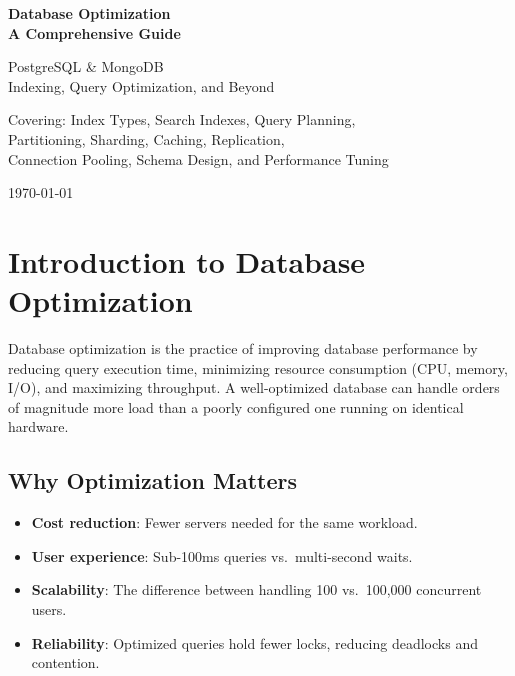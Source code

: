 \documentclass[12pt,a4paper]{article}
\begin{document}
\begin{titlepage}
\centering
\vspace*{2cm}
{\Huge\bfseries Database Optimization\\[0.5cm] A Comprehensive Guide\par}
\vspace{1.5cm}
{\Large PostgreSQL \& MongoDB\\[0.3cm] Indexing, Query Optimization, and Beyond\par}
\vspace{2cm}
{\large Covering: Index Types, Search Indexes, Query Planning,\\
Partitioning, Sharding, Caching, Replication,\\
Connection Pooling, Schema Design, and Performance Tuning\par}
\vspace{3cm}
{\large\today\par}
\vfill
\end{titlepage}

\tableofcontents
\newpage

\section{Introduction to Database Optimization}

Database optimization is the practice of improving database performance by reducing query execution time, minimizing resource consumption (CPU, memory, I/O), and maximizing throughput. A well-optimized database can handle orders of magnitude more load than a poorly configured one running on identical hardware.

\subsection{Why Optimization Matters}

\begin{itemize}
    \item \textbf{Cost reduction}: Fewer servers needed for the same workload.
    \item \textbf{User experience}: Sub-100ms queries vs.\ multi-second waits.
    \item \textbf{Scalability}: The difference between handling 100 vs.\ 100,000 concurrent users.
    \item \textbf{Reliability}: Optimized queries hold fewer locks, reducing deadlocks and contention.
\end{itemize}
\end{document}
